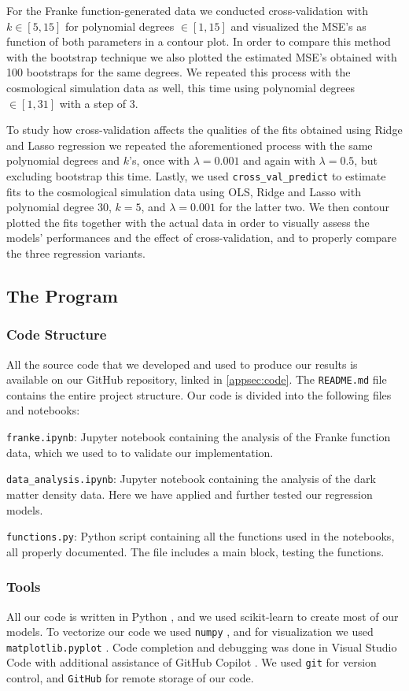 \documentclass[aps,pra,english,notitlepage,reprint,nofootinbib]{revtex4-1}  %
\begin{document}
For the Franke function-generated data we conducted cross-validation with $k \in [5,15]$ for polynomial degrees $\in [1,15]$ and visualized the MSE's as function of both parameters in a contour plot. In order to compare this method with the bootstrap technique we also plotted the estimated MSE's obtained with 100 bootstraps for the same degrees. We repeated this process with the cosmological simulation data as well, this time using polynomial degrees $\in [1, 31]$ with a step of 3.

To study how cross-validation affects the qualities of the fits obtained using Ridge and Lasso regression we repeated the aforementioned process with the same polynomial degrees and $k$'s, once with $\lambda = 0.001$ and again with $\lambda = 0.5$, but excluding bootstrap this time. Lastly, we used \verb|cross_val_predict| to estimate fits to the cosmological simulation data using OLS, Ridge and Lasso with polynomial degree 30, $k = 5$, and $\lambda = 0.001$ for the latter two. We then contour plotted the fits together with the actual data in order to visually assess the models' performances and the effect of cross-validation, and to properly compare the three regression variants.


\subsection{The Program}\label{subsec:program}
\subsubsection{Code Structure}\label{subsubsec:codestructure}
All the source code that we developed and used to produce our results is available on our GitHub repository, linked in \cref{appsec:code}. The \verb|README.md| file contains the entire project structure. Our code is divided into the following files and notebooks:

\verb|franke.ipynb|: Jupyter notebook containing the analysis of the Franke function data, which we used to to validate our implementation.

\verb|data_analysis.ipynb|: Jupyter notebook containing the analysis of the dark matter density data. Here we have applied and further tested our regression models.

\verb|functions.py|: Python script containing all the functions used in the notebooks, all properly documented. The file includes a main block, testing the functions.


\subsubsection{Tools}\label{subsubsec:tools}
All our code is written in Python \cite{Python}, and we used scikit-learn \cite{scikit-learn} to create most of our models. To vectorize our code we used \verb|numpy| \cite{Numpy}, and for visualization we used \verb|matplotlib.pyplot| \cite{Matplotlib}. Code completion and debugging was done in Visual Studio Code \cite{VSCode} with additional assistance of GitHub Copilot \cite{Copilot}. We used \verb|git| \cite{Git} for version control, and \verb|GitHub| \cite{GitHub} for remote storage of our code.
\end{document}
